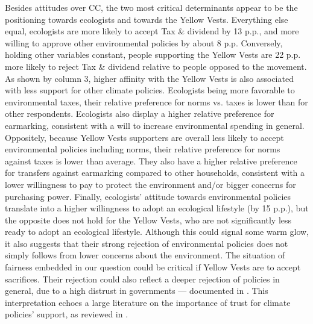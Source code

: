 \documentclass[english,5p,authoryear]{elsarticle}
\begin{document}
Besides attitudes over CC, the two most critical determinants appear to be the positioning towards ecologists and towards the Yellow Vests. Everything else equal, ecologists are more likely to accept Tax \& dividend by 13 p.p., and more willing to approve other environmental policies by about 8 p.p. Conversely, holding other variables constant, people supporting the Yellow Vests are 22 p.p. more likely to reject Tax \& dividend relative to people opposed to the movement. As shown by column 3, higher affinity with the Yellow Vests is also associated with less support for other climate policies. Ecologists being more favorable to environmental taxes, their relative preference for norms vs. taxes is lower than for other respondents. Ecologists also display a higher relative preference for earmarking, consistent with a will to increase environmental spending in general. Oppositely, because Yellow Vests supporters are overall less likely to accept environmental policies including norms, their relative preference for norms against taxes is lower than average. They also have a higher relative preference for transfers against earmarking compared to other households, consistent with a lower willingness to pay to protect the environment and/or bigger concerns for purchasing power. Finally, ecologists' attitude towards environmental policies translate into a higher willingness to adopt an ecological lifestyle (by 15 p.p.), but the opposite does not hold for the Yellow Vests, who are not significantly less ready to adopt an ecological lifestyle. Although this could signal some warm glow, it also suggests that their strong rejection of environmental policies does not simply follows from lower concerns about the environment. The situation of fairness embedded in our question could be critical if Yellow Vests are to accept sacrifices. Their rejection could also reflect a deeper rejection of policies in general, due to a high distrust in governments --- documented in \citet{algan_et_al_19}. This interpretation echoes a large literature on the importance of trust for climate policies' support, as reviewed in \citet{drews_van_der_bergh_2016}. 

\end{document}

